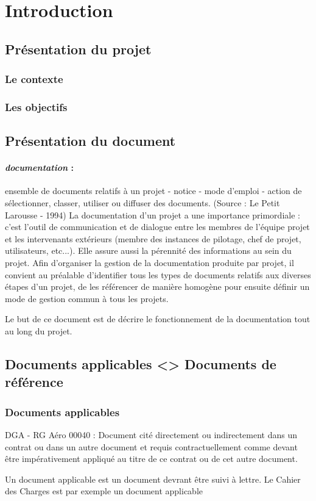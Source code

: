 \section{Introduction}     
  \subsection{Présentation du projet}
    
    \subsubsection{Le contexte}     
     
    \subsubsection{Les objectifs}    
     
  \subsection{Présentation du document}
  
    \paragraph*{\textit{documentation} :}ensemble de documents relatifs à un projet - notice - mode d’emploi - action de sélectionner, classer, utiliser ou diffuser des documents. (Source : Le Petit Larousse - 1994)
    La documentation d’un projet a une importance primordiale : c’est l’outil de communication et de dialogue entre les membres de l’équipe projet et les intervenants extérieurs (membre des instances de pilotage, chef de projet, utilisateurs, etc...). Elle assure aussi la pérennité des informations au sein du projet.
    Afin d’organiser la gestion de la documentation produite par projet, il convient au préalable d’identifier tous les types de documents relatifs aux diverses étapes d’un projet, de les référencer de manière homogène pour ensuite définir un mode de gestion commun à tous les projets.
    \par Le but de ce document est de décrire le fonctionnement de la documentation tout au long du projet.
  
  \subsection{Documents applicables <> Documents de référence}
    \subsubsection{Documents applicables}
      DGA - RG Aéro 00040 : Document cité directement ou indirectement dans un contrat ou dans un autre document et requis contractuellement comme devant être impérativement appliqué au titre de ce contrat ou de cet autre document.
      \par Un document applicable est un document devrant être suivi à lettre. Le Cahier des Charges est par exemple un document applicable
